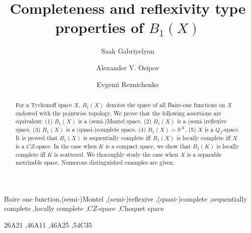 \documentclass[preprint,11pt]{elsarticle}
\numberwithin{equation}{section}
\numberwithin{theorem}{section}
\newcommand{\IR}{\mathbb{R}}
\begin{document}
\begin{frontmatter}


\title{Completeness and reflexivity type properties of $B_1(X)$} %


\author{Saak Gabriyelyan}%
\address{Department of Mathematics, Ben-Gurion University of the Negev, Beer-Sheva, Israel}

\author{Alexander V. Osipov}%
\address{Krasovskii Institute of Mathematics and Mechanics, Ural Federal University, Yekaterinburg, Russia}


\author{Evgenii Reznichenko}%
\address{Department of Mathematics, Lomonosov Mosow State University, Moscow, Russia}


\begin{abstract}
For a Tychonoff space $X$,  $B_1(X)$  denotes the space of all Baire-one functions on $X$ endowed with the pointwise topology. We prove that the following assertions are equivalent: (1) $B_1(X)$ is a (semi-)Montel space, (2) $B_1(X)$ is a (semi-)reflexive space, (3) $B_1(X)$ is a (quasi-)complete space, (4) $B_1(X)=\IR^X$, (5)  $X$ is a $Q_f$-space. It is proved that $B_1(X)$ is sequentially complete iff $B_1(X)$ is locally complete  iff   $X$ is a $CZ$-space. In the case when $K$ is a compact space, we show that $B_1(K)$ is locally complete  iff $K$ is scattered. We thoroughly study the case when $X$ is a separable metrizable space. Numerous distinguished examples are given.
\end{abstract}

\begin{keyword}
Baire one function\sep (semi-)Montel \sep (semi-)reflexive  \sep (quasi-)complete \sep sequentially complete \sep locally complete \sep $CZ$-space \sep Choquet space


\MSC[2020] 26A21 \sep 46A11 \sep 46A25 \sep 54C35 %

\end{keyword}

\end{frontmatter}



\end{document}
